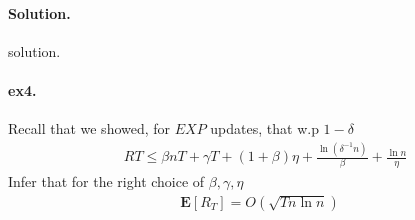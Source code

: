 \documentclass{article}
\newcommand{\expp}[1]{ \mathbf{E} \left[ {#1} \right]}
\begin{document}
\begin{multicols*}{2}
  \paragraph{Solution.} solution. 
  \paragraph{ex4.} Recall that we showed, for $EXP$ updates, that w.p $1 - \delta$ 
  \begin{equation*}
    \begin{split}
      &  R{T} \le \beta n T + \gamma T + \left( 1 + \beta \right)\eta + \frac{\ln\left( \delta^{-1} n \right) }{\beta} + \frac{\ln n}{\eta}  
    \end{split}
  \end{equation*}
  Infer that for the right choice of $\beta,\gamma, \eta$ 
  \begin{equation*}
    \begin{split}
      \expp{R_{T}} = O\left( \sqrt{T n \ln n } \right)
    \end{split}
  \end{equation*}
\end{multicols*}
  \printbibliography 
\end{document}
